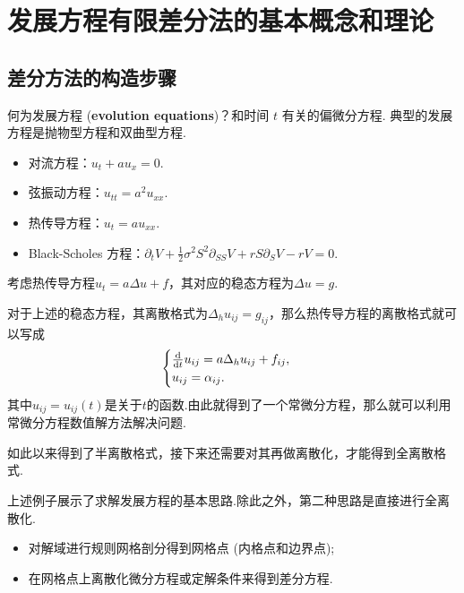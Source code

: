 \chapter{发展方程有限差分法的基本概念和理论}


\section{差分方法的构造步骤}

何为发展方程 (\textbf{evolution equations})？和时间 $t$ 有关的偏微分方程. 典型的发展方程是抛物型方程和双曲型方程.

\begin{instance}[若干实例]
    \begin{itemize}
        \item 对流方程：$u_t + a u_x = 0$.
        \item 弦振动方程：$u_{tt} = a^2 u_{xx}$.
        \item 热传导方程：$u_t = a u_{xx}$.
        \item Black-Scholes 方程：$\partial_t V + \frac{1}{2}\sigma^2 S^2 \partial_{SS} V + r S \partial_S V - r V = 0$.
    \end{itemize}
\end{instance}

\begin{instance}
    考虑热传导方程$u_t=a\Delta u+f$，其对应的稳态方程为$\Delta u=g$.\par
    对于上述的稳态方程，其离散格式为$\Delta_h u_{ij}=g_{ij}$，那么热传导方程的离散格式就可以写成
    \[\begin{cases}
        \frac{\mathop{}\!\mathrm{d}}{\mathop{}\!\mathrm{d} t}u_{ij}=a\Delta_h u_{ij}+f_{ij}, \\
        u_{ij}=\alpha_{ij}.
    \end{cases}\]
    其中$u_{ij}=u_{ij}(t)$是关于$t$的函数.由此就得到了一个常微分方程，那么就可以利用常微分方程数值解方法解决问题.\par
    如此以来得到了半离散格式，接下来还需要对其再做离散化，才能得到全离散格式.\par
\end{instance}

上述例子展示了求解发展方程的基本思路.除此之外，第二种思路是直接进行全离散化.\par

\begin{note}[差分方法构造要点]
    \begin{itemize}
    \item 对解域进行规则网格剖分得到网格点 (内格点和边界点);
    \item 在网格点上离散化微分方程或定解条件来得到差分方程.
\end{itemize}
\end{note}


